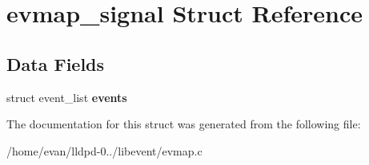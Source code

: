 \section{evmap\-\_\-signal \-Struct \-Reference}
\label{structevmap__signal}
\subsection*{\-Data \-Fields}
\begin{DoxyCompactItemize}
\item 
struct event\-\_\-list {\bfseries events}\label{structevmap__signal_a106e111bd7c72b4abb8f4c298bd5a772}

\end{DoxyCompactItemize}


\-The documentation for this struct was generated from the following file\-:\begin{DoxyCompactItemize}
\item 
/home/evan/lldpd-\/0../libevent/evmap.\-c\end{DoxyCompactItemize}

